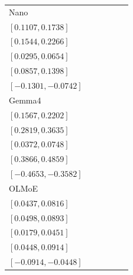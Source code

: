 \begin{tabular*}{\linewidth}{@{\extracolsep{\fill}}lccccc@{}}
Nano & \begin{tabular}[t]{@{}c@{}}\(0.1414\)\\\([0.1107,0.1738]\)\end{tabular} & \begin{tabular}[t]{@{}c@{}}\(0.1897\)\\\([0.1544,0.2266]\)\end{tabular} & \begin{tabular}[t]{@{}c@{}}\(0.0466\)\\\([0.0295,0.0654]\)\end{tabular} & \begin{tabular}[t]{@{}c@{}}\(0.1121\)\\\([0.0857,0.1398]\)\end{tabular} & \begin{tabular}[t]{@{}c@{}}\(-0.1017\)\\\([-0.1301,-0.0742]\)\end{tabular}\\[2pt]
Gemma4 & \begin{tabular}[t]{@{}c@{}}\(0.1879\)\\\([0.1567,0.2202]\)\end{tabular} & \begin{tabular}[t]{@{}c@{}}\(0.3224\)\\\([0.2819,0.3635]\)\end{tabular} & \begin{tabular}[t]{@{}c@{}}\(0.0552\)\\\([0.0372,0.0748]\)\end{tabular} & \begin{tabular}[t]{@{}c@{}}\(0.4362\)\\\([0.3866,0.4859]\)\end{tabular} & \begin{tabular}[t]{@{}c@{}}\(-0.4121\)\\\([-0.4653,-0.3582]\)\end{tabular}\\[2pt]
OLMoE & \begin{tabular}[t]{@{}c@{}}\(0.0621\)\\\([0.0437,0.0816]\)\end{tabular} & \begin{tabular}[t]{@{}c@{}}\(0.0690\)\\\([0.0498,0.0893]\)\end{tabular} & \begin{tabular}[t]{@{}c@{}}\(0.0310\)\\\([0.0179,0.0451]\)\end{tabular} & \begin{tabular}[t]{@{}c@{}}\(0.0672\)\\\([0.0448,0.0914]\)\end{tabular} & \begin{tabular}[t]{@{}c@{}}\(-0.0672\)\\\([-0.0914,-0.0448]\)\end{tabular}\\[2pt]

\end{tabular*}
